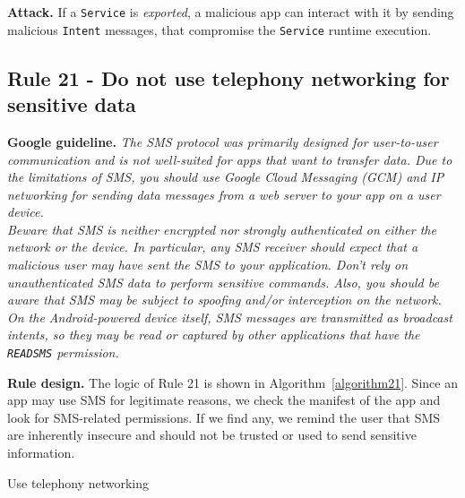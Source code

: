 \textbf{Attack.} If a \texttt{Service} is \emph{exported}, a malicious app can interact with it by sending malicious \texttt{Intent} messages, that compromise the \texttt{Service} runtime execution.

\subsection{Rule 21 - Do not use telephony networking for sensitive data} 
\textbf{Google guideline.} \emph{The SMS protocol was primarily designed for user-to-user communication and is not well-suited for apps that want to transfer data. Due to the limitations of SMS, you should use \textit{Google Cloud Messaging} (GCM) and IP networking for sending data messages from a web server to your app on a user device.
\\
Beware that SMS is neither encrypted nor strongly authenticated on either the network or the device. In particular, any SMS receiver should expect that a malicious user may have sent the SMS to your application. Don't rely on unauthenticated SMS data to perform sensitive commands. Also, you should be aware that SMS may be subject to spoofing and/or interception on the network. On the Android-powered device itself, SMS messages are transmitted as broadcast intents, so they may be read or captured by other applications that have the \texttt{READ\textunderscore SMS} permission.}

\textbf{Rule design.} The logic of Rule 21 is shown in Algorithm~\ref{algorithm21}. Since an app may use SMS for legitimate reasons, we check the manifest of the app and look for SMS-related permissions. If we find any, we remind the user that SMS are inherently insecure and should not be trusted or used to send sensitive information. 
 
 \setcounter{algocf}{20}
\begin{algorithm}[]
\SetAlgoLined
{}
\caption{Use telephony networking}
\label{algorithm21}
\end{algorithm}

